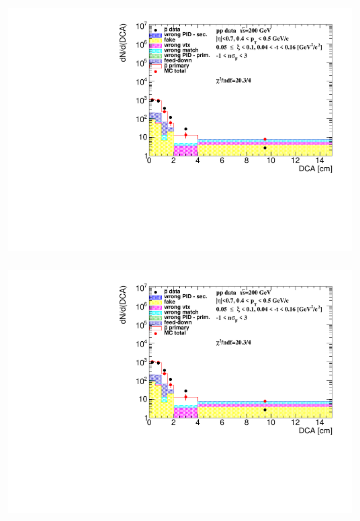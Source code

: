 \begin{figure}[h!]
\begin{subfigure}{.45\textwidth}
	\end{subfigure}
	\begin{subfigure}{.45\textwidth}
		\includegraphics[width=\linewidth, page=8]{chapters/chrgSTAR/img/DCAproton/background_p_bar_1.pdf}
	\end{subfigure}
	\begin{subfigure}{.45\textwidth}
		\includegraphics[width=\linewidth, page=11]{chapters/chrgSTAR/img/DCAproton/background_p_bar_1.pdf}
	\end{subfigure}
	\begin{subfigure}{.45\textwidth}

\end{subfigure}
\end{figure}
